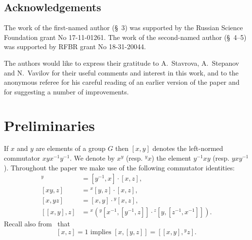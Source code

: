 \documentclass[10pt,a4paper,twoside]{article}
\theoremstyle{remark}
\theoremstyle{definition}
\numberwithin{lemma}{section}
\numberwithin{prop}{section}
\numberwithin{corollary}{section}
\numberwithin{externaltheorem}{section}
\numberwithin{equation}{section}
\begin{document}
\subsection{Acknowledgements} 
The work of the first-named author (\S~3) was supported by the Russian Science Foundation grant No 17-11-01261. 
The work of the second-named author (\S~4--5) was supported by RFBR grant No 18-31-20044.

The authors would like to express their gratitude to A.~Stavrova, A.~Stepanov and N.~Vavilov for their useful comments and interest in this work, and to the anonymous referee for his careful reading of an earlier version of the paper and for suggesting a number of improvements.

\section{Preliminaries}
If $x$ and $y$ are elements of a group $G$ then $[x, y]$ denotes the left-normed commutator $xyx^{-1}y^{-1}$.
We denote by $x^y$ (resp. ${}^y\!x$) the element $y^{-1}xy$ (resp. $yxy^{-1}$). 
Throughout the paper we make use of the following commutator identities:
\begin{align}
 [x, yz]^y               & =   [y^{-1}, x] \cdot [x, z], \label{rel43} \\ 
 \label{eq:H1ii} [xy, z] & =   {}^x[y, z] \cdot [x,z], \\
 \label{eq:H1ii-2}[x, yz]& =   [x, y] \cdot {}^{y}\![x, z], \\
 [[x, y], z] & =   {}^{x}\!\left({}^{y}[x^{-1}, [ y^{-1}, z]] \cdot {}^z[y, [ z^{-1}, x^{-1}]] \right). \label{HW-variant} \end{align}
Recall also from~\cite[Lemma~3.1.1]{RS76} that
\begin{equation} \label{eq:H1iii} [x,z] = 1 \text{ implies } [x, [y,z]] = [[x,y],{}^yz]. \end{equation} 
\end{document}

